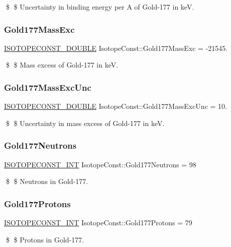 \$ \$ Uncertainty in binding energy per A of Gold-\/177 in keV. \mbox{\label{group___isotope_const-_gold-_au177_ga9494462520d27415b485d4fdea77548c}} 
\subsubsection{\texorpdfstring{Gold177\+Mass\+Exc}{Gold177MassExc}}
{\footnotesize\ttfamily \mbox{\hyperlink{group___isotope_const-_macros_ga8f45a7272ce02c0b4c65c44636ed719a}{I\+S\+O\+T\+O\+P\+E\+C\+O\+N\+S\+T\+\_\+\+D\+O\+U\+B\+LE}} Isotope\+Const\+::\+Gold177\+Mass\+Exc = -\/21545.}

\$ \$ Mass excess of Gold-\/177 in keV. \mbox{\label{group___isotope_const-_gold-_au177_ga54b15e07d59f825f51b955b1795c59aa}} 
\subsubsection{\texorpdfstring{Gold177\+Mass\+Exc\+Unc}{Gold177MassExcUnc}}
{\footnotesize\ttfamily \mbox{\hyperlink{group___isotope_const-_macros_ga8f45a7272ce02c0b4c65c44636ed719a}{I\+S\+O\+T\+O\+P\+E\+C\+O\+N\+S\+T\+\_\+\+D\+O\+U\+B\+LE}} Isotope\+Const\+::\+Gold177\+Mass\+Exc\+Unc = 10.}

\$ \$ Uncertainty in mass excess of Gold-\/177 in keV. \mbox{\label{group___isotope_const-_gold-_au177_gaee3c527aad7eccd3d865cb827c6d84b0}} 
\subsubsection{\texorpdfstring{Gold177\+Neutrons}{Gold177Neutrons}}
{\footnotesize\ttfamily \mbox{\hyperlink{group___isotope_const-_macros_ga5f18360b3e99483a35c32d789e62621c}{I\+S\+O\+T\+O\+P\+E\+C\+O\+N\+S\+T\+\_\+\+I\+NT}} Isotope\+Const\+::\+Gold177\+Neutrons = 98}

\$ \$ Neutrons in Gold-\/177. \mbox{\label{group___isotope_const-_gold-_au177_gaa0a85563deac1ad6dfc3e954982441c4}} 
\subsubsection{\texorpdfstring{Gold177\+Protons}{Gold177Protons}}
{\footnotesize\ttfamily \mbox{\hyperlink{group___isotope_const-_macros_ga5f18360b3e99483a35c32d789e62621c}{I\+S\+O\+T\+O\+P\+E\+C\+O\+N\+S\+T\+\_\+\+I\+NT}} Isotope\+Const\+::\+Gold177\+Protons = 79}

\$ \$ Protons in Gold-\/177. 